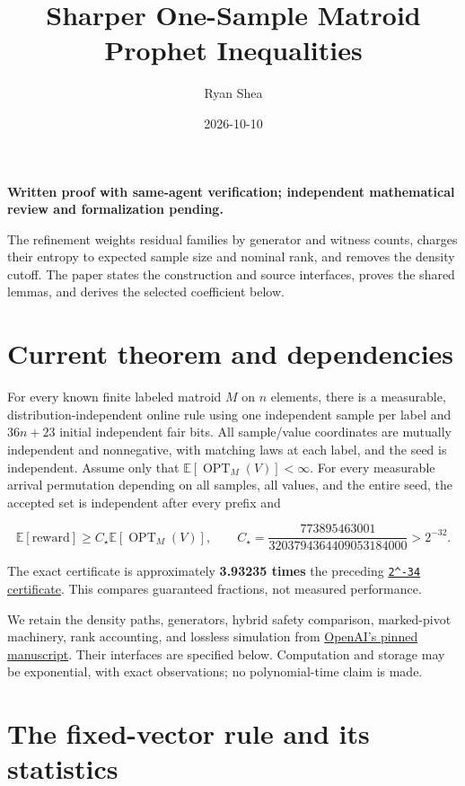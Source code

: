 \documentclass[11pt]{article}
\title{Sharper One-Sample Matroid Prophet Inequalities}
\author{Ryan Shea}
\date{2026-10-10}
\begin{document}
\maketitle
\textbf{Written proof with same-agent verification; independent mathematical review and formalization pending.}

The refinement weights residual families by generator and witness counts, charges their entropy to expected sample size and nominal rank, and removes the density cutoff. The paper states the construction and source interfaces, proves the shared lemmas, and derives the selected coefficient below.

\section{Current theorem and dependencies}\label{current-theorem-and-dependencies}

For every known finite labeled matroid \(M\) on \(n\) elements, there is a measurable, distribution-independent online rule using one independent sample per label and \(36n+23\) initial independent fair bits. All sample/value coordinates are mutually independent and nonnegative, with matching laws at each label, and the seed is independent. Assume only that \(\mathbb E[\operatorname{OPT}_M(V)]<\infty\). For every measurable arrival permutation depending on all samples, all values, and the entire seed, the accepted set is independent after every prefix and

\[\mathbb E[\mathrm{reward}]\ge C_\star\mathbb E[\operatorname{OPT}_M(V)],\qquad
C_\star=\frac{773895463001}{3203794364409053184000}>2^{-32}.\]

The exact certificate is approximately \textbf{3.93235 times} the preceding \href{https://github.com/shea256/matroid-prophet-inequality/blob/master/results/joint-residual.md}{\texttt{2\^{}-34} certificate}. This compares guaranteed fractions, not measured performance.

We retain the density paths, generators, hybrid safety comparison, marked-pivot machinery, rank accounting, and lossless simulation from \href{https://github.com/openai/math/blob/fd4aeeb2ee4fc729c18d98444fed42fd0529eeeb/preprints/One-Sample-Suffices-for-Matroid-Prophet-Inequalities-against-an-Almighty-Adversary-September-23-2026/final.pdf}{OpenAI's pinned manuscript}. Their interfaces are specified below. Computation and storage may be exponential, with exact observations; no polynomial-time claim is made.

\section{The fixed-vector rule and its statistics}\label{the-fixed-vector-rule-and-its-statistics}
\end{document}
